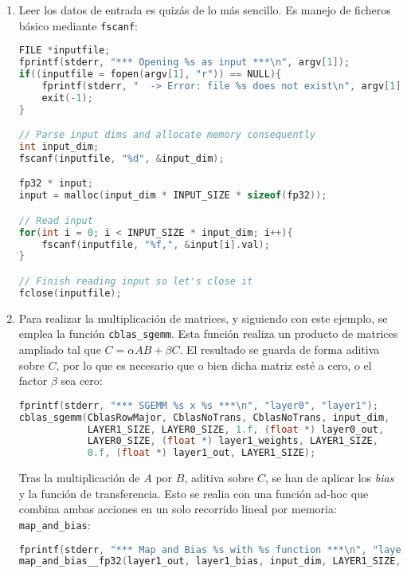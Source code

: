 \begin{enumerate}
    \item Leer los datos de entrada es quizás de lo más sencillo. Es manejo de ficheros básico mediante \texttt{fscanf}:\medskip
\begin{lstlisting}[language=C]
FILE *inputfile;
fprintf(stderr, "*** Opening %s as input ***\n", argv[1]);
if((inputfile = fopen(argv[1], "r")) == NULL){
    fprintf(stderr, "  -> Error: file %s does not exist\n", argv[1]);
    exit(-1);
}

// Parse input dims and allocate memory consequently
int input_dim;
fscanf(inputfile, "%d", &input_dim);

fp32 * input;
input = malloc(input_dim * INPUT_SIZE * sizeof(fp32));

// Read input
for(int i = 0; i < INPUT_SIZE * input_dim; i++){
    fscanf(inputfile, "%f,", &input[i].val);
}

// Finish reading input so let's close it
fclose(inputfile);
\end{lstlisting}

    \item Para realizar la multiplicación de matrices, y siguiendo con este ejemplo, se emplea la función \texttt{cblas\_sgemm}. Esta función realiza un producto de matrices ampliado tal que $C = \alpha AB + \beta C$. El resultado se guarda de forma aditiva sobre $C$, por lo que es necesario que o bien dicha matriz esté a cero, o el factor $\beta$ sea cero:\medskip
\begin{lstlisting}[language=C]
fprintf(stderr, "*** SGEMM %s x %s ***\n", "layer0", "layer1");
cblas_sgemm(CblasRowMajor, CblasNoTrans, CblasNoTrans, input_dim,
            LAYER1_SIZE, LAYER0_SIZE, 1.f, (float *) layer0_out,
            LAYER0_SIZE, (float *) layer1_weights, LAYER1_SIZE,
            0.f, (float *) layer1_out, LAYER1_SIZE);
\end{lstlisting}

    Tras la multiplicación de $A$ por $B$, aditiva sobre $C$, se han de aplicar los \textit{bias} y la función de transferencia. Esto se realia con una función ad-hoc que combina ambas acciones en un solo recorrido lineal por memoria: \texttt{map\_and\_bias}:\medskip
\begin{lstlisting}[language=C]
fprintf(stderr, "*** Map and Bias %s with %s function ***\n", "layer1_out", "sigmoid__fp32");
map_and_bias__fp32(layer1_out, layer1_bias, input_dim, LAYER1_SIZE, 'N', sigmoid__fp32);
\end{lstlisting}


\end{enumerate}
